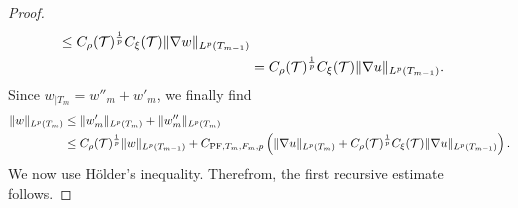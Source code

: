 \documentclass[10pt,a4paper]{article}
\begin{document}
\begin{proof}
\begin{align*}
        \leq 
        C_\rho({\mathcal T})^{\frac 1 p} C_\xi({\mathcal T})
        \| \nabla w \|_{L^{p}(T_{m-1})}
        \\&
        =
        C_\rho({\mathcal T})^{\frac 1 p} C_\xi({\mathcal T})
        \| \nabla u \|_{L^{p}(T_{m-1})}
        .
    \end{align*}
    Since $w_{|T_{m}} = w''_{m} + w'_{m}$, we finally find 
    \begin{align*}
        \| w \|_{L^{p}(T_{m})}
        &
        \leq  
        \| w'_{m} \|_{L^{p}(T_{m})}
        + 
        \| w''_{m} \|_{L^{p}(T_{m})}
        \\&
        \leq  
        C_\rho({\mathcal T})^{\frac 1 p} 
        \| w \|_{L^{p}(T_{m-1})} 
        + 
        C_{{\rm PF},T_{m},F_{m},p} 
        \left( 
            \| \nabla u \|_{L^{p}(T_{m})} 
            + 
            C_\rho({\mathcal T})^{\frac 1 p} C_\xi({\mathcal T})
        \| \nabla u \|_{L^{p}(T_{m-1})}
        \right). 
    \end{align*}
    We now use H\"older's inequality. 
    Therefrom, the first recursive estimate follows.
    

\end{proof}
\end{document}
